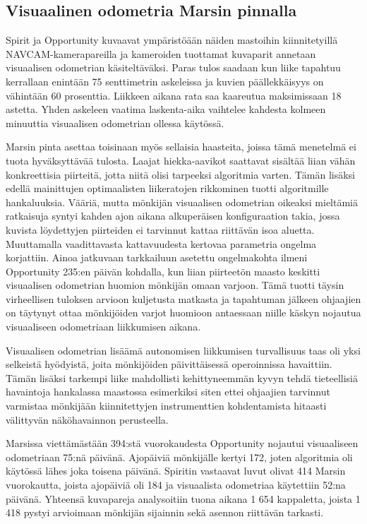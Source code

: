 \documentclass[finnish]{tktltiki2}
\theoremstyle{definition}
\theoremstyle{remark}
\begin{document}
\subsection{Visuaalinen odometria Marsin pinnalla}
Spirit ja Opportunity kuvaavat ympäristöään näiden mastoihin kiinnitetyillä NAVCAM-kamerapareilla ja kameroiden tuottamat kuvaparit annetaan visuaalisen odometrian käsiteltäväksi. Paras tulos saadaan kun liike tapahtuu kerrallaan enintään 75 senttimetrin askeleissa ja kuvien päällekkäisyys on vähintään 60 prosenttia. Liikkeen aikana rata saa kaareutua maksimissaan 18 astetta. Yhden askeleen vaatima laskenta-aika vaihtelee kahdesta kolmeen minuuttia visuaalisen odometrian ollessa käytössä.

Marsin pinta asettaa toisinaan myös sellaisia haasteita, joissa tämä menetelmä ei tuota hyväksyttävää tulosta. Laajat hiekka-aavikot saattavat sisältää liian vähän konkreettisia piirteitä, jotta niitä olisi tarpeeksi algoritmia varten. Tämän lisäksi edellä mainittujen optimaalisten liikeratojen rikkominen tuotti algoritmille hankaluuksia. Vääriä, mutta mönkijän visuaalisen odometrian oikeaksi mieltämiä ratkaisuja syntyi kahden ajon aikana alkuperäisen konfiguraation takia, jossa kuvista löydettyjen piirteiden ei tarvinnut kattaa riittävän isoa aluetta. Muuttamalla vaadittavasta kattavuudesta kertovaa parametria ongelma korjattiin. Ainoa jatkuvaan tarkkailuun asetettu ongelmakohta ilmeni Opportunity 235:en päivän kohdalla, kun liian piirteetön maasto keskitti visuaalisen odometrian huomion mönkijän omaan varjoon. Tämä tuotti täysin virheellisen tuloksen arvioon kuljetusta matkasta ja tapahtuman jälkeen ohjaajien on täytynyt ottaa mönkijöiden varjot huomioon antaessaan niille käskyn nojautua visuaaliseen odometriaan liikkumisen aikana.

Visuaalisen odometrian lisäämä autonomisen liikkumisen turvallisuus taas oli yksi selkeistä hyödyistä, joita mönkijöiden päivittäisessä operoinnissa havaittiin. Tämän lisäksi tarkempi liike mahdollisti kehittyneemmän kyvyn tehdä tieteellisiä havaintoja hankalassa maastossa esimerkiksi siten ettei ohjaajien tarvinnut varmistaa mönkijään kiinnitettyjen instrumenttien kohdentamista hitaasti välittyvän näköhavainnon perusteella.

Marsissa viettämästään 394:stä vuorokaudesta Opportunity nojautui visuaaliseen odometriaan 75:nä päivänä. Ajopäiviä mönkijälle kertyi 172, joten algoritmia oli käytössä lähes joka toisena päivänä. Spiritin vastaavat luvut olivat 414 Marsin vuorokautta, joista ajopäiviä oli 184 ja visuaalista odometriaa käytettiin 52:na päivänä. Yhteensä kuvapareja analysoitiin tuona aikana 1 654 kappaletta, joista 1 418 pystyi arvioimaan mönkijän sijainnin sekä asennon riittävän tarkasti.
\end{document}
